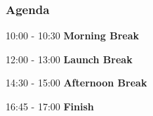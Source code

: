 \begin{frame}
  \frametitle{Agenda}
  \vspace{8em}

  \begin{description}
    \item 10:00 - 10:30 \textbf{Morning Break}
    \item 12:00 - 13:00 \textbf{Launch Break}
    \item 14:30 - 15:00 \textbf{Afternoon Break}
    \item 16:45 - 17:00 \textbf{Finish}
  \end{description}
\end{frame}
